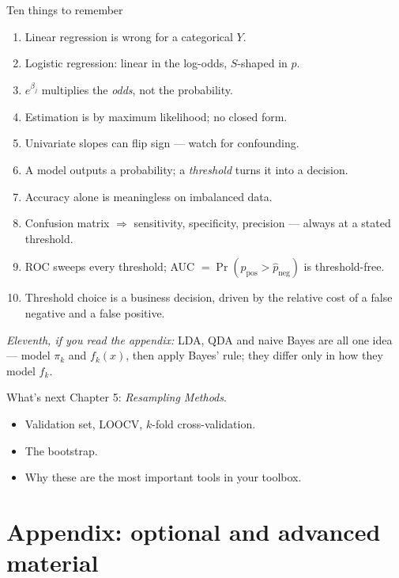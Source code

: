 \documentclass[aspectratio=169,11pt]{beamer}
\begin{document}
\begin{frame}{Ten things to remember}
  \begin{enumerate}
    \item Linear regression is wrong for a categorical $Y$.
    \item Logistic regression: linear in the log-odds, $S$-shaped in $p$.
    \item $e^{\beta_j}$ multiplies the \emph{odds}, not the probability.
    \item Estimation is by maximum likelihood; no closed form.
    \item Univariate slopes can flip sign --- watch for confounding.
    \item A model outputs a probability; a \emph{threshold} turns it into
          a decision.
    \item Accuracy alone is meaningless on imbalanced data.
    \item Confusion matrix $\Rightarrow$ sensitivity, specificity,
          precision --- always at a stated threshold.
    \item ROC sweeps every threshold; AUC $=\Pr(\hat p_{\text{pos}}>\hat p_{\text{neg}})$
          is threshold-free.
    \item Threshold choice is a business decision, driven by the relative
          cost of a false negative and a false positive.
  \end{enumerate}
  \vspace{1mm}
  {\footnotesize \emph{Eleventh, if you read the appendix:} LDA, QDA and naive
  Bayes are all one idea --- model $\pi_k$ and $f_k(x)$, then apply Bayes'
  rule; they differ only in how they model $f_k$.}
\end{frame}

\begin{frame}{What's next}
  Chapter 5: \emph{Resampling Methods}.
  \begin{itemize}
    \item Validation set, LOOCV, $k$-fold cross-validation.
    \item The bootstrap.
    \item Why these are the most important tools in your toolbox.
  \end{itemize}
\end{frame}


\appendix
\AtBeginSection[]{}
\section{Appendix: optional and advanced material}
\end{document}
